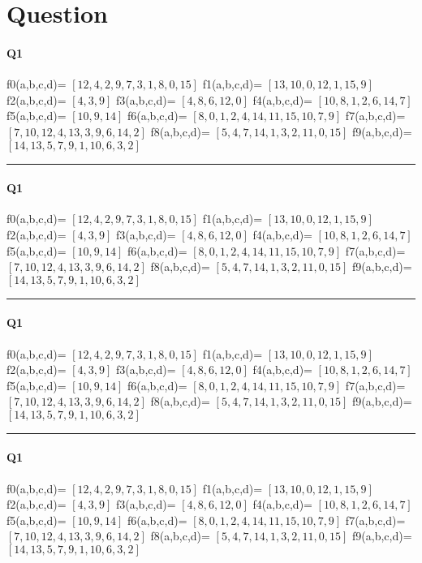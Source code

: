 
\section{Question}

\paragraph{Q1}


f0(a,b,c,d)= $[12, 4, 2, 9, 7, 3, 1, 8, 0, 15]$
f1(a,b,c,d)= $[13, 10, 0, 12, 1, 15, 9]$
f2(a,b,c,d)= $[4, 3, 9]$
f3(a,b,c,d)= $[4, 8, 6, 12, 0]$
f4(a,b,c,d)= $[10, 8, 1, 2, 6, 14, 7]$
f5(a,b,c,d)= $[10, 9, 14]$
f6(a,b,c,d)= $[8, 0, 1, 2, 4, 14, 11, 15, 10, 7, 9]$
f7(a,b,c,d)= $[7, 10, 12, 4, 13, 3, 9, 6, 14, 2]$
f8(a,b,c,d)= $[5, 4, 7, 14, 1, 3, 2, 11, 0, 15]$
f9(a,b,c,d)= $[14, 13, 5, 7, 9, 1, 10, 6, 3, 2]$

\hrule width 1\linewidth
\paragraph{Q1}


f0(a,b,c,d)= $[12, 4, 2, 9, 7, 3, 1, 8, 0, 15]$
f1(a,b,c,d)= $[13, 10, 0, 12, 1, 15, 9]$
f2(a,b,c,d)= $[4, 3, 9]$
f3(a,b,c,d)= $[4, 8, 6, 12, 0]$
f4(a,b,c,d)= $[10, 8, 1, 2, 6, 14, 7]$
f5(a,b,c,d)= $[10, 9, 14]$
f6(a,b,c,d)= $[8, 0, 1, 2, 4, 14, 11, 15, 10, 7, 9]$
f7(a,b,c,d)= $[7, 10, 12, 4, 13, 3, 9, 6, 14, 2]$
f8(a,b,c,d)= $[5, 4, 7, 14, 1, 3, 2, 11, 0, 15]$
f9(a,b,c,d)= $[14, 13, 5, 7, 9, 1, 10, 6, 3, 2]$

\hrule width 1\linewidth
\paragraph{Q1}


f0(a,b,c,d)= $[12, 4, 2, 9, 7, 3, 1, 8, 0, 15]$
f1(a,b,c,d)= $[13, 10, 0, 12, 1, 15, 9]$
f2(a,b,c,d)= $[4, 3, 9]$
f3(a,b,c,d)= $[4, 8, 6, 12, 0]$
f4(a,b,c,d)= $[10, 8, 1, 2, 6, 14, 7]$
f5(a,b,c,d)= $[10, 9, 14]$
f6(a,b,c,d)= $[8, 0, 1, 2, 4, 14, 11, 15, 10, 7, 9]$
f7(a,b,c,d)= $[7, 10, 12, 4, 13, 3, 9, 6, 14, 2]$
f8(a,b,c,d)= $[5, 4, 7, 14, 1, 3, 2, 11, 0, 15]$
f9(a,b,c,d)= $[14, 13, 5, 7, 9, 1, 10, 6, 3, 2]$

\hrule width 1\linewidth
\paragraph{Q1}


f0(a,b,c,d)= $[12, 4, 2, 9, 7, 3, 1, 8, 0, 15]$
f1(a,b,c,d)= $[13, 10, 0, 12, 1, 15, 9]$
f2(a,b,c,d)= $[4, 3, 9]$
f3(a,b,c,d)= $[4, 8, 6, 12, 0]$
f4(a,b,c,d)= $[10, 8, 1, 2, 6, 14, 7]$
f5(a,b,c,d)= $[10, 9, 14]$
f6(a,b,c,d)= $[8, 0, 1, 2, 4, 14, 11, 15, 10, 7, 9]$
f7(a,b,c,d)= $[7, 10, 12, 4, 13, 3, 9, 6, 14, 2]$
f8(a,b,c,d)= $[5, 4, 7, 14, 1, 3, 2, 11, 0, 15]$
f9(a,b,c,d)= $[14, 13, 5, 7, 9, 1, 10, 6, 3, 2]$

